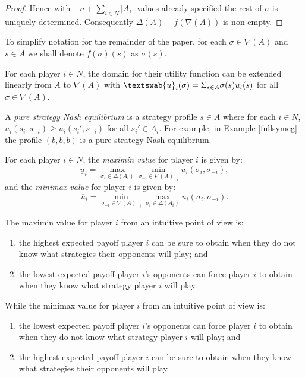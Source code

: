 \begin{proposition}
\begin{proof}
			Hence with $-n + \sum_{i \in N}|A_i|$ values already specified the rest of $\sigma$ is uniquely determined. Consequently $\Delta(A) - f(\nabla(A))$ is non-empty. %
		\end{proof}
	\end{proposition}
	
	To simplify notation for the remainder of the paper, for each $\sigma \in \nabla(A)$ and $s \in A$ we shall denote $f(\sigma)(s)$ as $\sigma(s)$. 
	
	For each player $i \in N$, the domain for their utility function can be extended linearly from $A$ to $\nabla(A)$ with $\textswab{u}_i(\sigma) = \Sigma_{s \in A}\sigma(s)u_i(s)$ for all $\sigma \in \nabla(A)$.
	
	A \textit{pure strategy Nash equilibrium} is a strategy profile $s \in A$ where for each $i \in N$, $u_i(s_i, s_{-i}) \geq u_i(s_i', s_{-i})$ for all $s_i' \in A_i$. For example, in Example \ref{fullsymeg} the profile $(b,b,b)$ is a pure strategy Nash equilibrium.
	
	For each player $i \in N$, the \textit{maximin value} for player $i$ is given by:
	\[\underline{u}_i = \max_{\sigma_i \in \Delta(A_i)}\min_{\sigma_{-i} \in {\nabla(A)}_{-i}} u_i(\sigma_i, \sigma_{-i}),\]
	and the \textit{minimax value} for player $i$ is given by:
	\[\overline{u}_i = \min_{\sigma_{-i} \in {\nabla(A)}_{-i}}\max_{\sigma_i \in \Delta(A_i)} u_i(\sigma_i, \sigma_{-i}).\]
	
	The maximin value for player $i$ from an intuitive point of view is:
	\begin{enumerate}
		\item the highest expected payoff player $i$ can be sure to obtain when they do not know what strategies their opponents will play; and
		\item the lowest expected payoff player $i$'s opponents can force player $i$ to obtain when they know what strategy player $i$ will play.
	\end{enumerate}
	
	While the minimax value for player $i$ from an intuitive point of view is:
	\begin{enumerate}
		\item the lowest expected payoff player $i$'s opponents can force player $i$ to obtain when they do not know what strategy player $i$ will play; and
		\item the highest expected payoff player $i$ can be sure to obtain when they know what strategies their opponents will play.
	\end{enumerate} 
	
